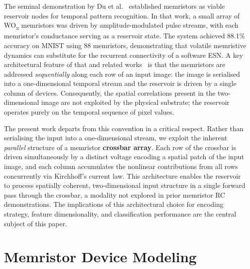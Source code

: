 \documentclass[11pt, oneside]{article}
\begin{document}
The seminal demonstration by Du et al.~\autocite{Du2017} established
memristors as viable reservoir nodes for temporal pattern recognition.
In that work, a small array of WO\textsubscript{x} memristors was driven
by amplitude-modulated pulse streams, with each memristor's conductance
serving as a reservoir state.
The system achieved 88.1\% accuracy on MNIST using 88 memristors,
demonstrating that volatile memristive dynamics can substitute for the
recurrent connectivity of a software ESN.
A key architectural feature of that and related
works~\autocite{Du2017,Hwang2025} is that the memristors are addressed
\emph{sequentially} along each row of an input image: the image is
serialised into a one-dimensional temporal stream and the reservoir is
driven by a single column of devices.
Consequently, the spatial correlations present in the two-dimensional
image are not exploited by the physical substrate; the reservoir
operates purely on the temporal sequence of pixel values.
 
The present work departs from this convention in a critical respect.
Rather than serialising the input into a one-dimensional stream,
we exploit the inherent \emph{parallel} structure of a memristor
\textbf{crossbar array}.
Each row of the crossbar is driven simultaneously by a distinct
voltage encoding a spatial patch of the input image,
and each column accumulates the nonlinear contributions from all rows
concurrently via Kirchhoff's current law.
This architecture enables the reservoir to process spatially coherent,
two-dimensional input structure in a single forward pass through the
crossbar, a modality not explored in prior memristor RC demonstrations.
The implications of this architectural choice for encoding strategy,
feature dimensionality, and classification performance are the central
subject of this paper.

\section{Memristor Device Modeling}




\end{document}
